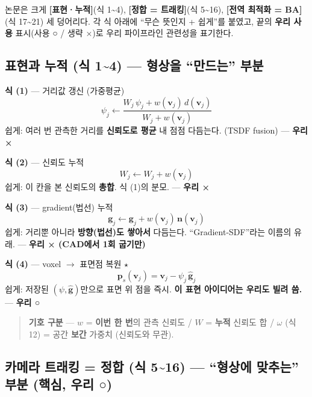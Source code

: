 논문은 크게 \textbf{[표현·누적]}(식 1\textasciitilde 4), \textbf{[정합 =
트래킹]}(식 5\textasciitilde 16), \textbf{[전역 최적화 = BA]}(식
17\textasciitilde 21) 세 덩어리다. 각 식 아래에 ``무슨 뜻인지 + 쉽게''를
붙였고, 끝의 \textbf{우리 사용} 표시(사용 ○ / 생략 ×)로 우리 파이프라인
관련성을 표기한다.

\subsection{표현과 누적 (식 1\textasciitilde 4) --- 형상을 ``만드는'' 부분}

\textbf{식 (1)} --- 거리값 갱신 (가중평균)
\begin{equation*}
  \psi_j \leftarrow
  \frac{W_j\,\psi_j + w(\mathbf{v}_j)\,d(\mathbf{v}_j)}{W_j + w(\mathbf{v}_j)}
  \tag{1}
\end{equation*}
쉽게: 여러 번 관측한 거리를 \textbf{신뢰도로 평균} 내 점점 다듬는다.
(TSDF fusion) --- \textbf{우리 ×}

\textbf{식 (2)} --- 신뢰도 누적
\begin{equation*}
  W_j \leftarrow W_j + w(\mathbf{v}_j)
  \tag{2}
\end{equation*}
쉽게: 이 칸을 본 신뢰도의 \textbf{총합}. 식 (1)의 분모. --- \textbf{우리 ×}

\textbf{식 (3)} --- gradient(법선) 누적
\begin{equation*}
  \mathbf{g}_j \leftarrow \mathbf{g}_j + w(\mathbf{v}_j)\,\mathbf{n}(\mathbf{v}_j)
  \tag{3}
\end{equation*}
쉽게: 거리뿐 아니라 \textbf{방향(법선)도 쌓아서} 다듬는다. ``Gradient-SDF''라는
이름의 유래. --- \textbf{우리 × (CAD에서 1회 굽기만)}

\textbf{식 (4)} --- voxel $\to$ 표면점 복원 $\star$
\begin{equation*}
  \mathbf{p}_s(\mathbf{v}_j) = \mathbf{v}_j - \psi_j\,\hat{\mathbf{g}}_j
  \tag{4}
\end{equation*}
쉽게: 저장된 $(\psi,\hat{\mathbf{g}})$만으로 표면 위 점을 즉시. \textbf{이 표현
아이디어는 우리도 빌려 씀.} --- \textbf{우리 ○}

\begin{quote}
  \small\textbf{기호 구분} --- $w$ = \textbf{이번 한 번}의 관측 신뢰도 /
  $W$ = \textbf{누적} 신뢰도 합 / $\omega$ (식 12) = 공간 \textbf{보간} 가중치
  (신뢰도와 무관).
\end{quote}

\subsection{카메라 트래킹 = 정합 (식 5\textasciitilde 16) --- ``형상에
맞추는'' 부분 (핵심, 우리 ○)}

